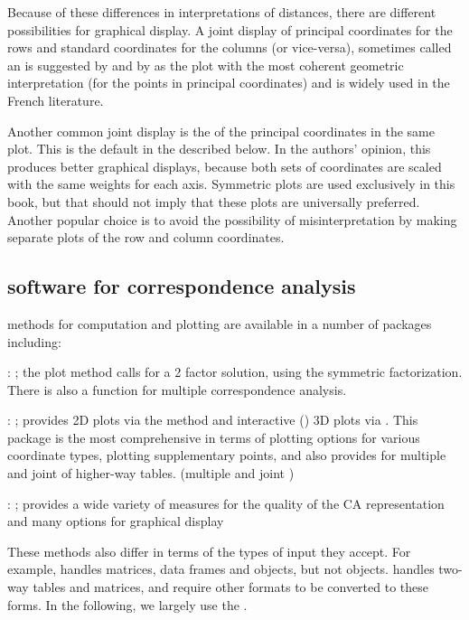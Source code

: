 \documentclass[11pt]{book}
\begin{document}
Because of these differences in interpretations of distances, there
are different possibilities for graphical display.
A joint display of principal coordinates for the rows and standard
coordinates for the columns (or vice-versa), sometimes called
an  is suggested by
\citet{GreenacreHastie:87} and by \citet{Greenacre:89} as the plot
with the most coherent geometric interpretation
(for the points in principal coordinates) and is widely
used in the French literature.

Another common joint display is the  of the principal
coordinates in the same plot.  This is the default
in the  described below.
In the authors' opinion, this produces better graphical displays, because
both sets of coordinates are scaled with the same weights for each axis.
Symmetric plots are used exclusively in this book, but that should
not imply that these plots are universally preferred.
Another popular choice is to avoid the possibility of misinterpretation
by making separate plots of the row and column coordinates.

\subsection{\R software for correspondence analysis}\label{sec:ca-R}

\CA methods for computation and plotting are available in a number of
\R packages including:
\begin{description*}
  \item {}: ; the plot method calls  for a 2 factor solution, using the symmetric factorization.  There is also a  function for
  multiple correspondence analysis.
  \item {}: ; provides 2D plots via the  method and
  interactive () 3D plots via .  This package is the most
  comprehensive in terms of plotting options for various coordinate types,
  plotting supplementary points,
  and also provides  for multiple and joint \ca of higher-way tables.
   (multiple and joint \ca)
  \item {}: ; provides a wide variety of measures for the 
  quality of the CA representation and many options for graphical display
\end{description*}
These methods also differ in terms of the types of input they accept.  For
example,  handles matrices, data frames and
 objects, but not  objects. 
 handles two-way tables and matrices, and require other
formats to be converted to these forms.
In the following,
we largely use the .
\end{document}
